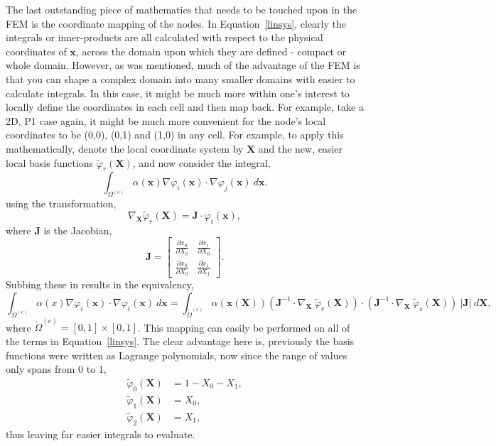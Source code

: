 The last outstanding piece of mathematics that needs to be touched upon in the FEM is the coordinate mapping of the nodes. In Equation~\ref{linsys}, clearly the integrals or inner-products are all calculated with respect to the physical coordinates of $\mathbf{x}$, across the domain upon which they are defined - compact or whole domain. However, as was mentioned, much of the advantage of the FEM is that you can shape a complex domain into many smaller domains with easier to calculate integrals. In this case, it might be much more within one's interest to locally define the coordinates in each cell and then map back. For example, take a 2D, P1 case again, it might be much more convenient for the node's local coordinates to be (0,0), (0,1) and (1,0) in any cell. For example, to apply this mathematically, denote the local coordinate system by $\mathbf{X}$ and the new, easier local basis functions $\widetilde\varphi_r(\mathbf{X})$, and now consider the integral,
\begin{equation}
	\int_{\Omega^{(e)}} \alpha(\mathbf{x})\nabla \varphi_i(\mathbf{x}) \cdot \nabla \varphi_j(\mathbf{x})~d\mathbf{x}.
\end{equation}
using the transformation,
\begin{equation}
	\nabla_\mathbf{X}\widetilde\varphi_r(\mathbf{X}) = \mathbf{J}\cdot \varphi_i(\mathbf{x}),
\end{equation}
where $\mathbf{J}$ is the Jacobian,
\begin{equation}
	\mathbf{J} =
	\left[\begin{matrix}
		\frac{\partial x_0}{\partial X_0} & \frac{\partial x_1}{\partial X_0}\\
		\frac{\partial x_0}{\partial X_0} & \frac{\partial x_1}{\partial X_1}
	\end{matrix}\right].
\end{equation}
Subbing these in results in the equivalency,
\begin{equation}
	\int_{\Omega^{(e)}} \alpha(x)\nabla \varphi_i(\mathbf{x}) \cdot \nabla \varphi_i(\mathbf{x})~d\mathbf{x} = \int_{\widetilde{\Omega}^{(e)}} \alpha(\mathbf{x}(\mathbf{X}))(\mathbf{J}^{-1}\cdot\nabla_\mathbf{X}~\widetilde\varphi_r(\mathbf{X}) )\cdot(\mathbf{J}^{-1}\cdot\nabla_\mathbf{X}~\widetilde\varphi_s(\mathbf{X}))~\vert\mathbf{J}\vert~d\mathbf{X},
\end{equation}
where ${\widetilde{\Omega}^{(e)}} = [0,1]\times[0,1]$. This mapping can easily be performed on all of the terms in Equation~\eqref{linsys}. The clear advantage here is, previously the basis functions were written as Lagrange polynomials, now since the range of values only spans from 0 to 1,
\begin{align}
	\widetilde\varphi_0(\mathbf{X}) &= 1 - X_0 - X_1,\\
	\widetilde\varphi_1(\mathbf{X}) &= X_0,\\
	\widetilde\varphi_2(\mathbf{X}) &= X_1,
\end{align}
thus leaving far easier integrals to evaluate.

